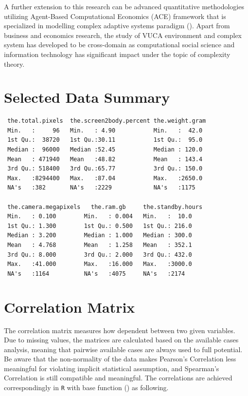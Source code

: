 \documentclass[utf8,english]{gradu3}
\begin{document}
A further extension to this research can be advanced quantitative methodologies utilizing Agent-Based Computational Economics (ACE) framework that is specialized in modelling complex adaptive systems paradigm (\cite{tesfatsion2003agent}). Apart from business and economics research, the study of VUCA environment and complex system has developed to be cross-domain as computational social science and information technology has significant impact under the topic of complexity theory.

\printbibliography

\appendix

\section{Selected Data Summary}
\label{app:data summary}
\begin{verbatim}
 the.total.pixels  the.screen2body.percent the.weight.gram 
 Min.   :     96   Min.   : 4.90           Min.   :  42.0  
 1st Qu.:  38720   1st Qu.:30.11           1st Qu.:  95.0  
 Median :  96000   Median :52.45           Median : 120.0  
 Mean   : 471940   Mean   :48.82           Mean   : 143.4  
 3rd Qu.: 518400   3rd Qu.:65.77           3rd Qu.: 150.0  
 Max.   :8294400   Max.   :87.04           Max.   :2650.0  
 NA's   :382       NA's   :2229            NA's   :1175    
 
 the.camera.megapixels   the.ram.gb     the.standby.hours
 Min.   : 0.100        Min.   : 0.004   Min.   :  10.0   
 1st Qu.: 1.300        1st Qu.: 0.500   1st Qu.: 216.0   
 Median : 3.200        Median : 1.000   Median : 300.0   
 Mean   : 4.768        Mean   : 1.258   Mean   : 352.1   
 3rd Qu.: 8.000        3rd Qu.: 2.000   3rd Qu.: 432.0   
 Max.   :41.000        Max.   :16.000   Max.   :3000.0   
 NA's   :1164          NA's   :4075     NA's   :2174     
\end{verbatim}


\section{Correlation Matrix}
\label{app:corr}

The correlation matrix measures how dependent between two given variables. Due to missing values, the matrices are calculated based on the available cases analysis, meaning that pairwise available cases are always used to full potential. Be aware that the non-normality of the data makes Pearson's Correlation less meaningful for violating implicit statistical assumption, and Spearman's Correlation is still compatible and meaningful. The correlations are achieved correspondingly in \texttt{R} with base function (\cite{RBase}) as following.
\end{document}
